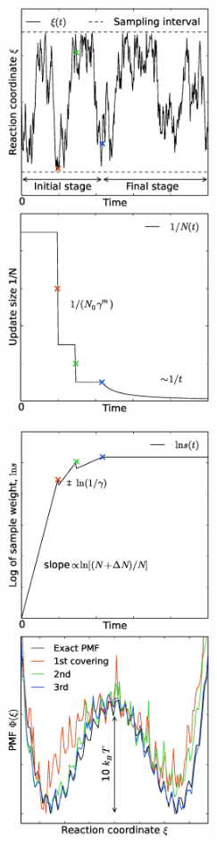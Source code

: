 \begin{figure}
\centerline{
\includegraphics[width=6cm]{plots/awh-traj} %
\includegraphics[width=6cm]{plots/awh-invN} %
}
\centerline{
\includegraphics[width=6cm]{plots/awh-sampleweights} %
\includegraphics[width=6cm]{plots/awh-pmfs} %
}
\end{figure}
